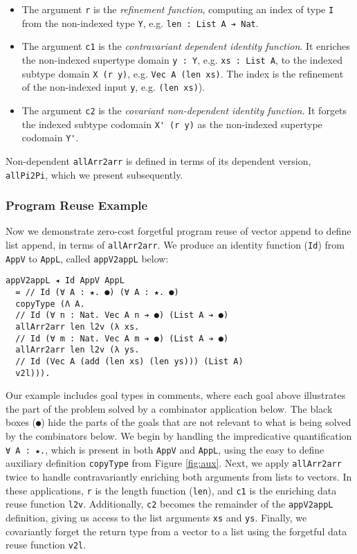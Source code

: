 \documentclass[acmsmall]{acmart}\settopmatter{}
\newcommand{\reffig}[1]{Figure \ref{fig:#1}}
\begin{document}
\begin{itemize}
\item The argument \verb;r;  is the
  \textit{refinement function}, computing an
  index of type \verb;I; from the
  non-indexed type \verb;Y;, e.g. \verb;len : List A ➔ Nat;.

\item The argument \verb;c1; is the
  \textit{contravariant dependent identity function}.
  It enriches the non-indexed supertype domain \verb;y : Y;,
  e.g. \verb;xs : List A;,
  to the indexed subtype domain \verb;X (r y);,
  e.g. \verb;Vec A (len xs);.
  The index is the refinement
  of the non-indexed input \verb;y;, e.g. \verb;(len xs);).

\item The argument \verb;c2; is the
  \textit{covariant non-dependent identity function}.
  It forgets the indexed subtype codomain \verb;X' (r y);
  as the non-indexed supertype codomain \verb;Y';.
\end{itemize}

Non-dependent \verb;allArr2arr; is defined in terms of its dependent
version, \verb;allPi2Pi;, which we present subsequently.

\subsubsection{Program Reuse Example}

Now we demonstrate zero-cost forgetful program reuse of vector append
to define list append, in terms of \verb;allArr2arr;. We produce
an identity function (\verb;Id;) from \verb;AppV; to \verb;AppL;,
called \verb;appV2appL; below:
\begin{verbatim}
appV2appL ◂ Id AppV AppL
  = // Id (∀ A : ★. ●) (∀ A : ★. ●)
  copyType (Λ A. 
  // Id (∀ n : Nat. Vec A n ➔ ●) (List A ➔ ●)
  allArr2arr len l2v (λ xs. 
  // Id (∀ m : Nat. Vec A m ➔ ●) (List A ➔ ●)
  allArr2arr len l2v (λ ys. 
  // Id (Vec A (add (len xs) (len ys))) (List A)
  v2l))).
\end{verbatim}
Our example includes goal types in comments, where each goal above
illustrates the part of the problem solved by a combinator
application below. The black boxes (\verb;●;) hide the parts of the
goals that are not relevant to what is being solved by the combinators
below. We begin by handling the impredicative quantification
\verb;∀ A : ★.;, which is present in both \verb;AppV; and \verb;AppL;,
using the easy to define auxiliary definition \verb;copyType; from
\reffig{aux}. Next, we apply \verb;allArr2arr; twice to handle
contravariantly enriching both arguments from lists to
vectors. In these applications, \verb;r; is the length function
(\verb;len;), and \verb;c1; is the enriching data reuse function
\verb;l2v;. Additionally, \verb;c2; becomes the remainder of the
\verb;appV2appL; definition, giving us access to the list arguments
\verb;xs; and \verb;ys;. Finally, we covariantly forget the return type from a
vector to a list using the forgetful data reuse function \verb;v2l;.
\end{document}
